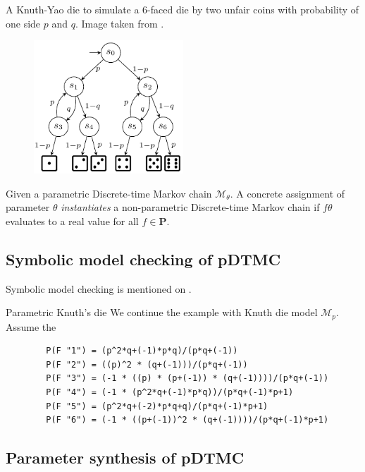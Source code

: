 \begin{example}
    A Knuth-Yao die to simulate a 6-faced die by two unfair coins with probability of one
    side $p$ and $q$. Image taken from \cite{katoen2016probabilistic}.
    \begin{figure}[H]
        \centering
        \includegraphics[width=0.5\textwidth]{figures/knuth_die_pq.png}
        \label{fig:knuth-die-pq}
    \end{figure}
\end{example}

Given a parametric Discrete-time Markov chain $\mathcal{M}_\theta$. A concrete assignment of parameter $\theta$
\textit{instantiates} a non-parametric Discrete-time Markov chain if $f{\theta}$ evaluates to a
real value for all $f\in\mathbf{P}$.

\subsection{Symbolic model checking of pDTMC}
Symbolic model checking is mentioned on \cite{daws2004symbolic}.
\begin{example}{Parametric Knuth's die}
    We continue the example with Knuth die model $\mathcal{M}_{p}$. Assume the
    \begin{lstlisting}
        P(F "1") = (p^2*q+(-1)*p*q)/(p*q+(-1))
        P(F "2") = ((p)^2 * (q+(-1)))/(p*q+(-1))
        P(F "3") = (-1 * ((p) * (p+(-1)) * (q+(-1))))/(p*q+(-1))
        P(F "4") = (-1 * (p^2*q+(-1)*p*q))/(p*q+(-1)*p+1)
        P(F "5") = (p^2*q+(-2)*p*q+q)/(p*q+(-1)*p+1)
        P(F "6") = (-1 * ((p+(-1))^2 * (q+(-1))))/(p*q+(-1)*p+1)
    \end{lstlisting}
\end{example}

\subsection{Parameter synthesis of pDTMC}

